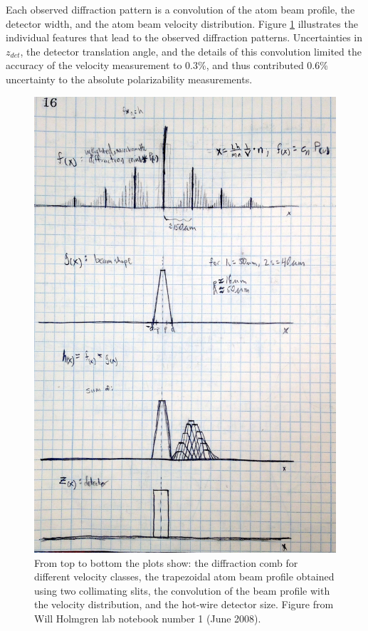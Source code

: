Each observed diffraction pattern is a convolution of the atom beam profile, the detector width, and the atom beam velocity distribution. Figure \ref{diffractionConv} illustrates the individual features that lead to the observed diffraction patterns. Uncertainties in $z_{det}$, the detector translation angle, and the details of this convolution limited the accuracy of the velocity measurement to 0.3\%, and thus contributed 0.6\% uncertainty to the absolute polarizability measurements. 


\begin{figure}
\centerline{\includegraphics[width=.75\textwidth]{Figures/diffractionConvolution4.jpg}}
\caption[Convolution of atom beam profile, detector width, and velocity distribution for diffraction patterns.]{\label{diffractionConv} From top to bottom the plots show: the diffraction comb for different velocity classes, the trapezoidal atom beam profile obtained using two collimating slits, the convolution of the beam profile with the velocity distribution, and the hot-wire detector size. Figure from Will Holmgren lab notebook number 1 (June 2008).}
\end{figure}



